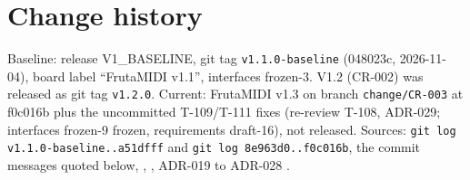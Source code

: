 \section{Change history}
\label{sec:changes}

Baseline: release V1\_BASELINE, git tag \texttt{v1.1.0-baseline} (048023c,
2026-11-04), board label ``FrutaMIDI v1.1'', interfaces frozen-3. V1.2 (CR-002) was
released as git tag \texttt{v1.2.0}. Current: FrutaMIDI v1.3 on branch
\texttt{change/CR-003} at f0c016b plus the uncommitted T-109/T-111 fixes
(re-review T-108, ADR-029; interfaces frozen-9 frozen,
requirements draft-16), not released. Sources:
\texttt{git log v1.1.0-baseline..a51dfff} and \texttt{git log 8e963d0..f0c016b},
the commit messages quoted below, , ,
ADR-019 to ADR-028 .


